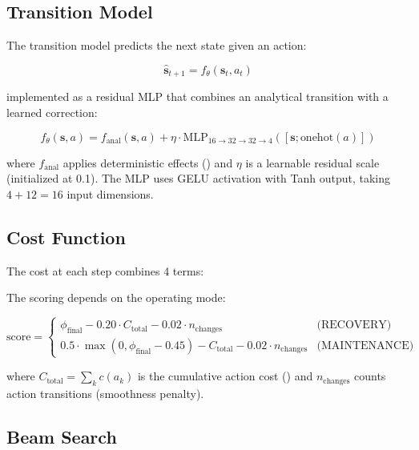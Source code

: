 \subsection{Transition Model}

The transition model predicts the next state given an action:

\begin{equation}
    \hat{\bm{s}}_{t+1} = f_\theta(\bm{s}_t, a_t)
\end{equation}

implemented as a residual MLP that combines an analytical transition
with a learned correction:

\begin{equation}
    f_\theta(\bm{s}, a) = f_{\text{anal}}(\bm{s}, a) + \eta \cdot \text{MLP}_{16 \to 32 \to 32 \to 4}([\bm{s}; \text{onehot}(a)])
\end{equation}

where $f_{\text{anal}}$ applies deterministic effects
() and $\eta$ is a learnable residual scale
(initialized at 0.1). The MLP uses GELU activation with Tanh output,
taking $4 + 12 = 16$ input dimensions.

\subsection{Cost Function}

The cost at each step combines 4 terms:

The scoring depends on the operating mode:

\begin{equation}
    \text{score} = \begin{cases}
        \phi_{\text{final}} - 0.20 \cdot C_{\text{total}} - 0.02 \cdot n_{\text{changes}} & \text{(RECOVERY)} \\
        0.5 \cdot \max(0, \phi_{\text{final}} - 0.45) - C_{\text{total}} - 0.02 \cdot n_{\text{changes}} & \text{(MAINTENANCE)}
    \end{cases}
    \label{eq:mpc_cost}
\end{equation}

where $C_{\text{total}} = \sum_k c(a_k)$ is the cumulative action cost
() and $n_{\text{changes}}$ counts action transitions
(smoothness penalty).

\subsection{Beam Search}

